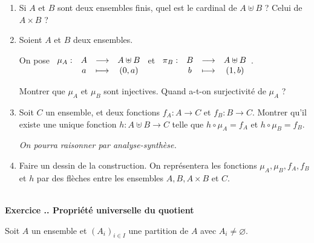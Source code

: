 \documentclass{article}
\newcommand{\fonction}[5]{\raisebox{-0.5\baselineskip}{$\begin{array}{lccc}
    #1: & #2 & \longrightarrow & #3 \\
        & #4 & \longmapsto & #5 \end{array}$}}
\newcounter{exo}
\newcommand{\exercice}[1][\null]{\textbf{\\ \large Exercice \thesection.\theexo. \normalsize #1} \addtocounter{exo}{1}}
\begin{document}
\begin{enumerate}

\item Si $A$ et $B$ sont deux ensembles finis, quel est le cardinal de $A \uplus B$ ? Celui de $A \times B$ ?
\item Soient $A$ et $B$ deux ensembles.

On pose $\fonction{\mu_A}{A}{A\uplus B}{a}{(0,a)}$ et $\fonction{\pi_B}{B}{A\uplus B}{b}{(1,b)}$.

Montrer que $\mu_A$ et $\mu_B$ sont injectives. Quand a-t-on surjectivité de $\mu_A$ ?

\item Soit $C$ un ensemble, et deux fonctions $f_A : A \rightarrow C$ et $f_B : B \rightarrow C$. Montrer qu'il existe une unique fonction $h : A \uplus B \rightarrow C$ telle que $h \circ \mu_A  = f_A$ et $h \circ \mu_B  = f_B$. 

\emph{On pourra raisonner par analyse-synthèse.}

\item Faire un dessin de la construction. On représentera les fonctions $\mu_A, \mu_B, f_A, f_B$ et $h$ par des flèches entre les ensembles $A, B, A \times B$ et $C$.

\end{enumerate}


\exercice[Propriété universelle du quotient]

Soit $A$ un ensemble et $(A_i)_{i \in I}$ une partition de $A$ avec $A_i \neq \varnothing$.
\end{document}
